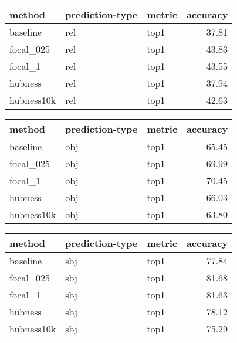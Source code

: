 \begin{tabular}{lllr}
\toprule
     method & prediction-type & metric &  accuracy \\
\midrule
   baseline &             rel &   top1 &     37.81 \\
  focal\_025 &             rel &   top1 &     43.83 \\
    focal\_1 &             rel &   top1 &     43.55 \\
    hubness &             rel &   top1 &     37.94 \\
 hubness10k &             rel &   top1 &     42.63 \\
\bottomrule
\end{tabular}
\begin{tabular}{lllr}
\toprule
     method & prediction-type & metric &  accuracy \\
\midrule
   baseline &             obj &   top1 &     65.45 \\
  focal\_025 &             obj &   top1 &     69.99 \\
    focal\_1 &             obj &   top1 &     70.45 \\
    hubness &             obj &   top1 &     66.03 \\
 hubness10k &             obj &   top1 &     63.80 \\
\bottomrule
\end{tabular}
\begin{tabular}{lllr}
\toprule
     method & prediction-type & metric &  accuracy \\
\midrule
   baseline &             sbj &   top1 &     77.84 \\
  focal\_025 &             sbj &   top1 &     81.68 \\
    focal\_1 &             sbj &   top1 &     81.63 \\
    hubness &             sbj &   top1 &     78.12 \\
 hubness10k &             sbj &   top1 &     75.29 \\
\bottomrule
\end{tabular}
